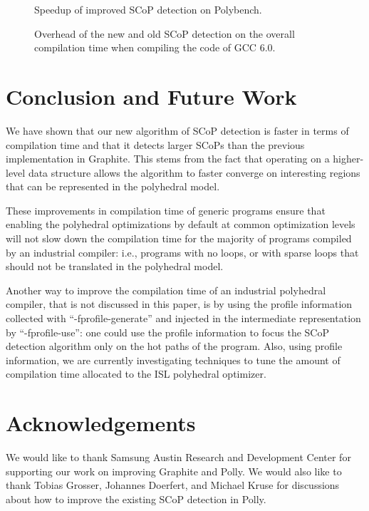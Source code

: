 \documentclass{sig-alternate}
\begin{document}
\begin {figure}
  \begin{center}
    \resizebox{\linewidth}{!}{}
  \end{center}
  \caption{Speedup of improved SCoP detection on Polybench.}
  \label{fig:polybench-speedup}
\end {figure}

\begin {figure}
  \begin{center}
    \resizebox{\linewidth}{!}{}
  \end{center}
  \caption{Overhead of the new and old SCoP detection on the overall compilation
    time when compiling the code of GCC 6.0.}
  \label{fig:gcc-speedup}
\end {figure}

\section{Conclusion and Future Work}
We have shown that our new algorithm of SCoP detection is faster in terms of
compilation time and that it detects larger SCoPs than the previous
implementation in Graphite.  This stems from the fact that operating on a
higher-level data structure allows the algorithm to faster converge on
interesting regions that can be represented in the polyhedral model.

These improvements in compilation time of generic programs ensure that enabling
the polyhedral optimizations by default at common optimization levels will not
slow down the compilation time for the majority of programs compiled by an
industrial compiler: i.e., programs with no loops, or with sparse loops that
should not be translated in the polyhedral model.

Another way to improve the compilation time of an industrial polyhedral
compiler, that is not discussed in this paper, is by using the profile
information collected with ``-fprofile-generate'' and injected in the
intermediate representation by ``-fprofile-use'': one could use the profile
information to focus the SCoP detection algorithm only on the hot paths of the
program.  Also, using profile information, we are currently investigating
techniques to tune the amount of compilation time allocated to the ISL
polyhedral optimizer.

\section{Acknowledgements}
We would like to thank Samsung Austin Research and Development Center for
supporting our work on improving Graphite and Polly.  We would also like to
thank Tobias Grosser, Johannes Doerfert, and Michael Kruse for discussions about
how to improve the existing SCoP detection in Polly.


{\small

}
\end{document}

